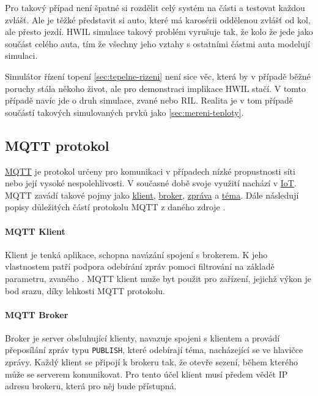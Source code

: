 Pro takový případ není špatné si rozdělit celý systém na části a testovat každou zvlášť. Ale je těžké představit si auto, které má karosérii oddělenou zvlášť od kol, ale přesto jezdí. HWIL simulace takový problém vyrušuje tak, že kolo  že jede jako součást celého auta, tím že všechny jeho vztahy s ostatními částmi auta modelují simulaci.

Simulátor řízení topení \ref{sec:tepelne-rizeni} není sice věc, která by v případě běžné poruchy stála někoho život, ale pro demonstraci implikace HWIL stačí. V tomto případě navíc jde o druh simulace, zvané  nebo RIL. Realita je v tom případě součástí takových simulovaných prvků jako \ref{sec:mereni-teploty}.

\subsection{MQTT protokol}
\label{subsec:mqtt-proto}

\href{http://mqtt.org/}{MQTT} je protokol určeny pro komunikaci v případech nízké propustnosti síti nebo její vysoké nespolehlivosti. V současné době svoje využití nachází v \href{https://en.wikipedia.org/wiki/Internet_of_things}{IoT}. MQTT zavádí takové pojmy jako \hyperref[par:client]{klient}, \hyperref[par:broker]{broker}, \hyperref[par:message]{zpráva} a \hyperref[par:topic]{téma}. Dále následují popisy důležitých částí protokolu MQTT z daného zdroje \cite{mqtt}.

\paragraph{MQTT Klient}
\label{par:client}

Klient je tenká aplikace, schopna navázání spojení s brokerem. K jeho vlastnostem patří podpora odebírání zpráv pomoci filtrování na základě parametru, zvaného \hyperref[par:topic]{}. MQTT klient muže byt použit pro zařízení, jejichž výkon je bod srazu, díky lehkosti MQTT protokolu.

\paragraph{MQTT Broker}
\label{par:broker}

Broker je server obsluhující klienty, navazuje spojeni s klientem a provádí přeposílání zpráv typu \texttt{PUBLISH}, které odebírají téma, nacházející se ve hlavičce zprávy. Každý klient se připojí k brokeru tak, že otevře sezení, během kterého může se serverem komunikovat. Pro tento účel klient musí předem vědět IP adresu brokeru, která pro něj bude přístupná.

